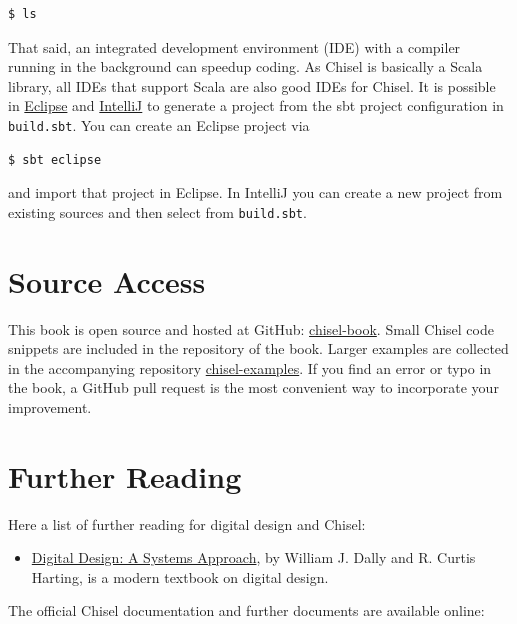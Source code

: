 \documentclass[%
    10pt, %
    headinclude, footexclude,
    openright, %
    notitlepage,
    cleardoubleempty,
    headsepline,
    pointlessnumbers,
    bibtotoc, idxtotoc,
    ]{scrbook}
\newcommand{\code}[1]{{\small{\texttt{#1}}}}
\newcommand{\myref}[2]{\href{#1}{#2}}
\begin{document}
\begin{verbatim}
$ ls
\end{verbatim}

That said, an integrated development environment (IDE) with a compiler running in
the background can speedup coding. As Chisel is basically a Scala library, all IDEs
that support Scala are also good IDEs for Chisel.
It is possible in \myref{https://www.eclipse.org/}{Eclipse} and
\myref{https://www.jetbrains.com/help/idea/discover-intellij-idea-for-scala.html}{IntelliJ}
to generate a project from the sbt project configuration in \code{build.sbt}.
You can create an Eclipse project via
\begin{verbatim}
$ sbt eclipse
\end{verbatim}
and import that project in Eclipse.
In IntelliJ you can create a new project from existing sources and then select from \code{build.sbt}.

\section{Source Access}

This book is open source and hosted at GitHub: \myref{https://github.com/schoeberl/chisel-book}{chisel-book}.
Small Chisel code snippets are included in the repository of the book.
Larger examples are collected in the accompanying repository \myref{https://github.com/schoeberl/chisel-examples}{chisel-examples}. If you find an error or typo in the book, a GitHub pull request is the most convenient way
to incorporate your improvement.

\section{Further Reading}

Here a list of further reading for digital design and Chisel:
\begin{itemize}
\item \myref{http://www.cambridge.org/es/academic/subjects/engineering/circuits-and-systems/digital-design-systems-approach}{Digital Design: A Systems Approach}, by William J. Dally and R. Curtis Harting,
is a modern textbook on digital design.
\end{itemize}

The official Chisel documentation and further documents are available online:
\end{document}

